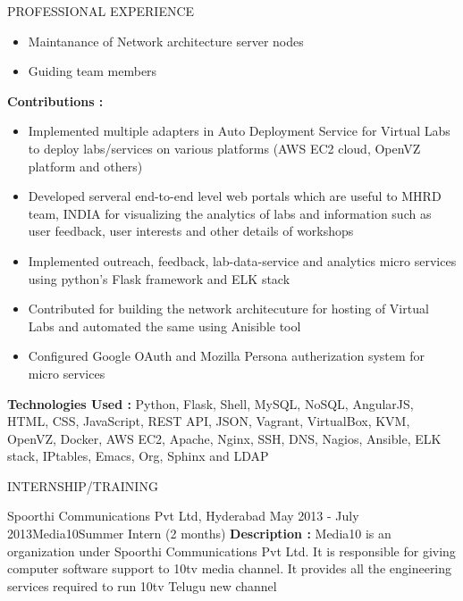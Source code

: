 \documentclass{resume} %
\begin{document}
\begin{rSection}{PROFESSIONAL EXPERIENCE}
\begin{rSubsection}
\begin{itemize}
    \item Maintanance of Network architecture server nodes

    \item Guiding team members
    \end{itemize}

    \hfill

    \textbf{Contributions : }
    \begin{itemize}

    \item Implemented multiple adapters in Auto Deployment
      Service for Virtual Labs to deploy labs/services on
      various platforms (AWS EC2 cloud, OpenVZ platform and
      others)
      
    \item Developed serveral end-to-end level web portals
      which are useful to MHRD team, INDIA for visualizing
      the analytics of labs and information such as user
      feedback, user interests and other details of
      workshops
      
    \item Implemented outreach, feedback, lab-data-service
      and analytics micro services using python's Flask
      framework and ELK stack
      
    \item Contributed for building the network architecuture
      for hosting of Virtual Labs and automated the same
      using Anisible tool

    \item Configured Google OAuth and Mozilla Persona
      autherization system for micro services
    \end{itemize}

    \hfill
    
    \textbf{Technologies Used : } Python, Flask, Shell,
    MySQL, NoSQL, AngularJS, HTML, CSS, JavaScript, REST
    API, JSON, Vagrant, VirtualBox, KVM, OpenVZ, Docker, AWS
    EC2, Apache, Nginx, SSH, DNS, Nagios, Ansible, ELK
    stack, IPtables, Emacs, Org, Sphinx and LDAP
      


  \end{rSubsection}

\end{rSection}

\break

\begin{rSection}{INTERNSHIP/TRAINING}
  \begin{rSubsection}
  {Spoorthi Communications Pvt Ltd, Hyderabad} {May 2013 -
    July 2013}{Media10}{Summer Intern (2 months)}
  \textbf{Description :} Media10 is an organization under
  Spoorthi Communications Pvt Ltd. It is responsible for
  giving computer software support to 10tv media channel. It
  provides all the engineering services required to run 10tv
  Telugu new channel
  \end{rSubsection} 

\end{rSection} 
\end{document}

